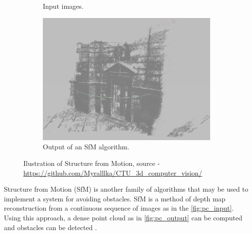 \begin{figure}[h]
\begin{subfigure}[h]{0.31\textwidth}
      \caption{Input images.}
      \label{fig:pc_input}
    \end{subfigure}
    \hfill
    \begin{subfigure}[h]{0.65\textwidth}
      \includegraphics[width=\textwidth]{graphics/reconstructed.png}
      \caption{Output of an SfM algorithm.}
      \label{fig:pc_output}
    \end{subfigure}
    \caption[Ilustration of Structure from Motion.]{Ilustration of Structure from Motion, source - \url{https://github.com/Myralllka/CTU_3d_computer_vision/}}
    \label{fig:pc_recons}
\end{figure}

Structure from Motion (SfM) is another family of algorithms that may be used to implement a system for avoiding obstacles. 
SfM is a method of depth map reconstruction from a continuous sequence of images as in the \autoref{fig:pc_input}.
Using this approach, a dense point cloud as in \autoref{fig:pc_output} can be computed and obstacles can be detected \cite{Lee2008}. 

